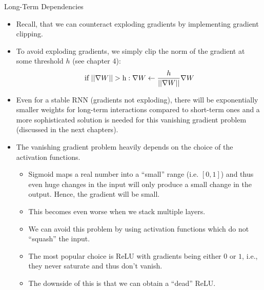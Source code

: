 \documentclass[11pt,compress,t,notes=noshow, xcolor=table]{beamer}
\begin{document}
\begin{vbframe}{Long-Term Dependencies}
  \begin{itemize}
    \item Recall, that we can counteract exploding gradients by implementing gradient clipping.
    \item To avoid exploding gradients, we simply clip the norm of the gradient at some threshold $h$ (see chapter 4): $$\text{if  } ||\nabla W|| > \text h: \nabla W \leftarrow \frac{h}{||\nabla W||} \nabla W $$
  \end{itemize}

  \begin{itemize}
    \item Even for a stable RNN (gradients not exploding), there will be exponentially smaller weights for long-term interactions compared to short-term ones and a more sophisticated solution is needed for this vanishing gradient problem (discussed in the next chapters).
    \item The {vanishing gradient problem} heavily depends on the choice of the activation functions.
    \begin{itemize} 
      \item Sigmoid maps a real number into a \enquote{small} range (i.e. $[0, 1]$) and thus even huge changes in the input will only produce a small change in the output. Hence, the gradient will be small.
      \item This becomes even worse when we stack multiple layers.
      \item We can avoid this problem by using activation functions which do not \enquote{squash} the input.
      \item The most popular choice is ReLU with gradients being either $0$ or $1$, i.e., they never saturate and thus don't vanish.
      \item The downside of this is that we can obtain a \enquote{dead} ReLU.
    \end{itemize}

  \end{itemize}


\end{vbframe}

\endlecture
\end{document}
